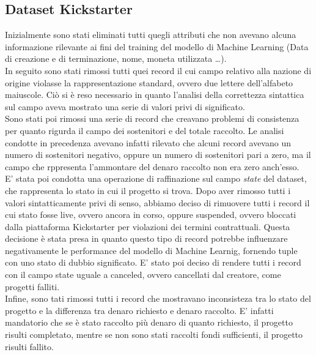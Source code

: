 \subsection{Dataset Kickstarter}
Inizialmente sono stati eliminati tutti quegli attributi che non avevano alcuna informazione rilevante ai fini del training del modello di Machine Learning (Data di creazione e di terminazione, nome, moneta utilizzata \dots).\\
In seguito sono stati rimossi tutti quei record il cui campo relativo alla nazione di origine violasse la rappresentazione standard, ovvero due lettere dell'alfabeto maiuscole. Ciò si è reso necessario in quanto l'analisi della correttezza sintattica sul campo aveva mostrato una serie di valori privi di significato.\\
Sono stati poi rimossi una serie di record che creavano problemi di consistenza per quanto rigurda il campo dei sostenitori e del totale raccolto. Le analisi condotte in precedenza avevano infatti rilevato che alcuni record avevano un numero di sostenitori negativo, oppure un numero di sostenitori pari a zero, ma il campo che rppresenta l'ammontare del denaro raccolto non era zero anch'esso.\\
E' stata poi condotta una operazione di raffinazione sul campo \textit{state} del dataset, che rappresenta lo stato in cui il progetto si trova. Dopo aver rimosso tutti i valori sintatticamente privi di senso, abbiamo deciso di rimuovere tutti i record il cui stato fosse live, ovvero ancora in corso, oppure suspended, ovvero bloccati dalla piattaforma Kickstarter per violazioni dei termini contrattuali. Questa decisione è stata presa in quanto questo tipo di record potrebbe influenzare negativamente le performance del modello di Machine Learnig, fornendo tuple con uno stato di dubbio significato.
E' stato poi deciso di rendere tutti i record con il campo state uguale a canceled, ovvero cancellati dal creatore, come progetti falliti.\\
Infine, sono tati rimossi tutti i record che mostravano inconsisteza tra lo stato del progetto e la differenza tra denaro richiesto e denaro raccolto. E' infatti mandatorio che se è stato raccolto più denaro di quanto richiesto, il progetto risulti completato, mentre se non sono stati raccolti fondi sufficienti, il progetto risulti fallito.\\
